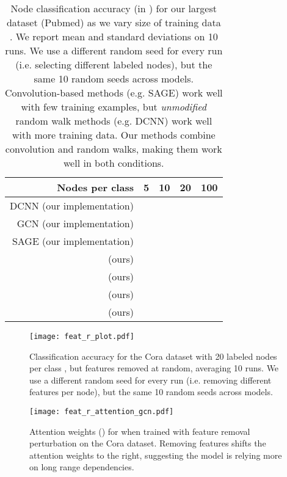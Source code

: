 \begin{table*}[t]
	\begin{center}
\begin{tabular}{rcccc}
 \textbf{Nodes per class} & 5 & 10 & 20 & 100 \\
\hline
DCNN (our implementation) &  &  &  &  \\
GCN (our implementation) &  &  &  &  \\
SAGE (our implementation) &  &  &  &  \\
\hline 

 (ours) &  &  &  &  \\
 (ours) &  &  &  &  \\
 (ours) &  &  &  &  \\
 (ours) &  &  &  &  \\
\end{tabular}
 \end{center}
\caption{Node classification accuracy (in ) for our largest dataset (Pubmed) as we vary size of training data . We report mean and standard deviations on 10 runs.
We use a different random seed for every run (i.e. selecting different labeled nodes), but the same 10 random seeds across models.
Convolution-based methods (e.g. SAGE) work well with few training examples, but \textit{unmodified} random walk methods (e.g. DCNN) work well with more training data. Our methods combine convolution and random walks, making them work well in both conditions. 
}
\label{table:npc}
\end{table*}

\begin{figure*}[t]
	\centering
	\texttt{[image: feat\_r\_plot.pdf]}
	\caption{
		Classification accuracy for the Cora dataset with 20 labeled nodes per class , but features removed at random, averaging 10 runs.
		We use a different random seed for every run (i.e. removing different features per node), but the same 10 random seeds across models.
	}
	\label{fig:featremoval}
\end{figure*}

\begin{figure*}[t]
	\centering
	\texttt{[image: feat\_r\_attention\_gcn.pdf]}
\caption{
	Attention weights () for  
when trained with feature removal perturbation on the Cora dataset. Removing features shifts the attention weights to the right, suggesting the model is relying more on long range dependencies.
	}
	\label{fig:attentionfeatremoval}
\end{figure*}


